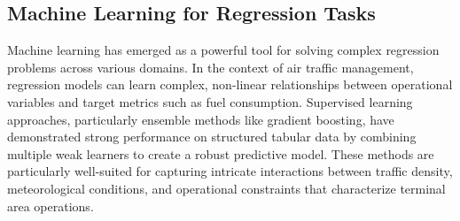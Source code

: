 \subsection{Machine Learning for Regression Tasks}
Machine learning has emerged as a powerful tool for solving complex regression problems across various domains. In the context of air traffic management, regression models can learn complex, non-linear relationships between operational variables and target metrics such as fuel consumption. Supervised learning approaches, particularly ensemble methods like gradient boosting, have demonstrated strong performance on structured tabular data by combining multiple weak learners to create a robust predictive model. These methods are particularly well-suited for capturing intricate interactions between traffic density, meteorological conditions, and operational constraints that characterize terminal area operations.
